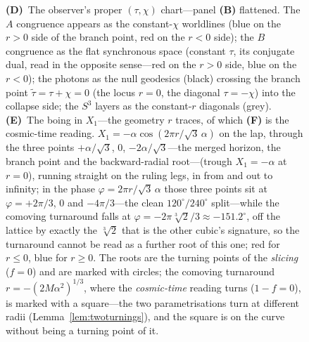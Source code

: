 \documentclass[11pt,a4paper]{article}
\theoremstyle{plain}
\theoremstyle{definition}
\theoremstyle{remark}
\begin{document}
\begin{figure}[htbp]
{\textbf{(D)}~The observer's proper $(\tau,\chi)$ chart---panel \textbf{(B)} flattened. The $A$ congruence appears as the constant-$\chi$ worldlines (blue on the $r>0$ side of the branch point, red on the $r<0$ side); the $B$ congruence as the flat synchronous space (constant $\tau$, its conjugate dual, read in the opposite sense---red on the $r>0$ side, blue on the $r<0$); the photons as the null geodesics (black) crossing the branch point $\tilde\tau=\tau+\chi=0$ (the locus $r=0$, the diagonal $\tau=-\chi$) into the collapse side; the $S^3$ layers as the constant-$r$ diagonals (grey).
\textbf{(E)}~The boing in $X_1$---the geometry $r$ traces, of which \textbf{(F)} is the cosmic-time reading. $X_1=-\alpha\cos(2\pi r/\sqrt3\,\alpha)$ on the lap, through the three points $+\alpha/\sqrt3$, $0$, $-2\alpha/\sqrt3$---the merged horizon, the branch point and the backward-radial root---(trough $X_1=-\alpha$ at $r=0$), running straight on the ruling legs, in from and out to infinity; in the phase $\varphi=2\pi r/\sqrt3\,\alpha$ those three points sit at $\varphi=+2\pi/3$, $0$ and $-4\pi/3$---the clean $120^{\circ}/240^{\circ}$ split---while the comoving turnaround falls at $\varphi=-2\pi\sqrt[3]{2}/3\approx-151.2^{\circ}$, off the lattice by exactly the $\sqrt[3]{2}$ that is the other cubic's signature, so the turnaround cannot be read as a further root of this one; red for $r\le0$, blue for $r\ge0$. The roots are the turning points of the \emph{slicing} ($f=0$) and are marked with circles; the comoving turnaround $r=-(2M\alpha^2)^{1/3}$, where the \emph{cosmic-time} reading turns ($1-f=0$), is marked with a square---the two parametrisations turn at different radii (Lemma~\ref{lem:twoturnings}), and the square is on the curve without being a turning point of it.
}
\end{figure}
\end{document}
